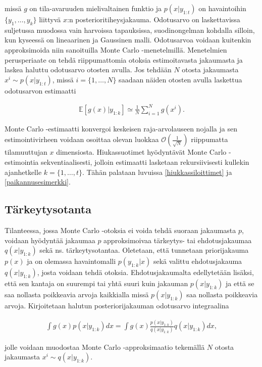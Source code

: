 \documentclass[
  12pt,
  a4paper, twoside]{book}
\begin{document}
\noindent missä \(g\) on tila-avaruuden mielivaltainen funktio ja \(p(x|y_{1:t})\) on havaintoihin \(\{y_1,\ldots,y_k\}\) liittyvä \(x\):n posterioritiheysjakauma. Odotusarvo on laskettavissa suljetussa muodossa vain harvoissa tapauksissa, suodinongelman kohdalla silloin, kun kyseessä on lineaarinen ja Gaussinen malli. Odotusarvoa voidaan kuitenkin approksimoida niin sanoituilla Monte Carlo -menetelmillä. Menetelmien perusperiaate on tehdä riippumattomia otoksia estimoitavasta jakaumasta ja laskea haluttu odotusarvo otosten avulla. Jos tehdään \(N\) otosta jakaumasta \(x^i\sim p(x|y_{1:t})\), missä \(i=\{1,\ldots,N\}\) saadaan näiden otosten avulla laskettua odotusarvon estimaatti

\begin{align}
\mathbb{E}[g(x)|y_{1:k}]\simeq\frac{1}{N}\sum_{i=1}^N g(x^i).
\end{align}

Monte Carlo -estimaatti konvergoi keskeisen raja-arvolauseen nojalla ja sen estimointivirheen voidaan osoittaa olevan luokkaa \(\mathcal{O}(\frac{1}{\sqrt{N}})\) riippumatta tilamuuttujan \(x\) dimensiosta. Hiukassuotimet hyödyntävät Monte Carlo -estimointia sekventiaalisesti, jolloin estimaatti lasketaan rekursiivisesti kullekin ajanhetkelle \(k=\{1,\ldots, t\}\). Tähän palataan luvuissa \ref{hiukkassiloittimet} ja \ref{paikannusesimerkki}.

\subsection{Tärkeytysotanta}

Tilanteessa, jossa Monte Carlo -otoksia ei voida tehdä suoraan jakaumasta \(p\), voidaan hyödyntää jakaumaa \(p\) approksimoivaa tärkeytys- tai ehdotusjakaumaa \(q(x|y_{1:k})\) sekä ns. tärkeytysotantaa. Oletetaan, että tunnetaan priorijakauma \(p(x)\) ja on olemassa havaintomalli \(p(y_{1:k}|x)\) sekä valittu ehdotusjakauma \(q(x|y_{1:k})\), josta voidaan tehdä otoksia. Ehdotusjakaumalta edellytetään lisäksi, että sen kantaja on suurempi tai yhtä suuri kuin jakauman \(p(x|y_{1:k})\) ja että se saa nollasta poikkeavia arvoja kaikkialla missä \(p(x|y_{1:k})\) saa nollasta poikkeavia arvoja. Kirjoitetaan halutun posteriorijakauman odotusarvo integraalina

\begin{align}
\int g(x)p(x|y_{1:k})dx=\int g(x)\frac{p(x|y_{1:k})}{q(x|y_{1:k})}q(x|y_{1:k})dx,
\end{align}

\noindent jolle voidaan muodostaa Monte Carlo -approksimaatio tekemällä \(N\) otosta jakaumasta \(x^i \sim q(x|y_{1:k})\).
\end{document}
